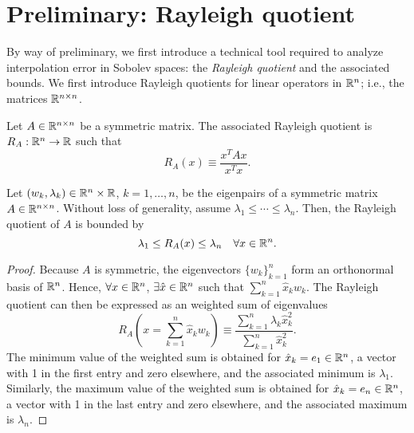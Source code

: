 \section{Preliminary: Rayleigh quotient}
By way of preliminary, we first introduce a technical tool required to analyze interpolation error in Sobolev spaces: the \emph{Rayleigh quotient} and the associated bounds.  We first introduce Rayleigh quotients for linear operators in $\mathbb{R}^n$; i.e., the matrices $\mathbb{R}^{n \times n}$.
\begin{definition}
  Let $A \in \mathbb{R}^{n \times n}$ be a symmetric matrix.  The associated Rayleigh quotient is $R_A: \mathbb{R}^n \to \mathbb{R}$ such that
  \begin{equation*}
    R_A(x) \equiv \frac{x^T A x}{x^T x}.
  \end{equation*}
\end{definition}
\begin{proposition}
  Let $(w_k,\lambda_k) \in \mathbb{R}^n \times \mathbb{R}$, $k = 1,\dots,n$, be the eigenpairs of a symmetric matrix $A \in \mathbb{R}^{n \times n}$.  Without loss of generality, assume $\lambda_1 \leq \cdots \leq \lambda_n$. Then, the Rayleigh quotient of $A$ is bounded by
  \begin{equation*}
    \lambda_1 \leq R_A(x) \leq \lambda_n \quad \forall x \in \mathbb{R}^n.
  \end{equation*}
  \begin{proof}
    Because $A$ is symmetric, the eigenvectors $\{w_k\}_{k=1}^n$ form an orthonormal basis of $\mathbb{R}^n$.  Hence, $\forall x \in \mathbb{R}^n$, $\exists \hat x \in \mathbb{R}^n$ such that $\sum_{k=1}^n \hat x_k w_k$.  The Rayleigh quotient can then be expressed as an weighted sum of eigenvalues
    \begin{equation*}
      R_A(x = \sum_{k=1}^n \hat x_k w_k) \equiv \frac{\sum_{k=1}^n \lambda_k \hat x_k^2}{\sum_{k=1}^n \hat x_k^2}.
    \end{equation*}
    The minimum value of the weighted sum is obtained for $\hat x_k = e_1 \in \mathbb{R}^n$, a vector with 1 in the first entry and zero elsewhere, and the associated minimum is $\lambda_1$.  Similarly, the maximum value of the weighted sum is obtained for $\hat x_k = e_n \in \mathbb{R}^n$, a vector with 1 in the last entry and zero elsewhere, and the associated maximum is $\lambda_n$.
  \end{proof}
\end{proposition}

